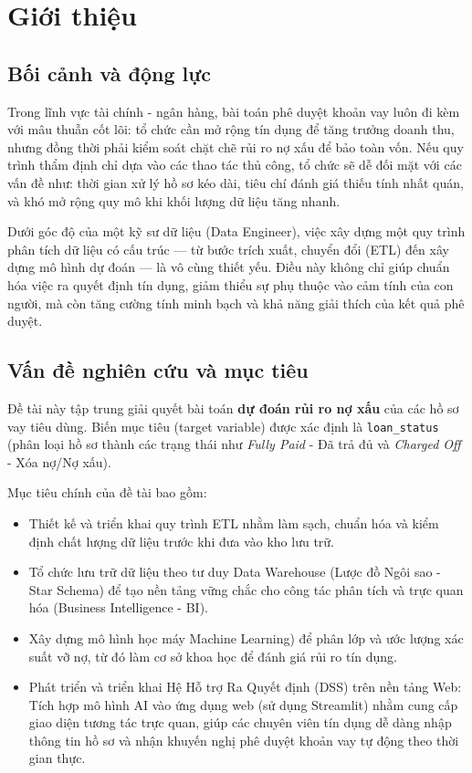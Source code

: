 \section{Giới thiệu}

\subsection{Bối cảnh và động lực}
Trong lĩnh vực tài chính - ngân hàng, bài toán phê duyệt khoản vay luôn đi kèm với mâu thuẫn cốt lõi: tổ chức cần mở rộng tín dụng để tăng trưởng doanh thu, nhưng đồng thời phải kiểm soát chặt chẽ rủi ro nợ xấu để bảo toàn vốn. Nếu quy trình thẩm định chỉ dựa vào các thao tác thủ công, tổ chức sẽ dễ đối mặt với các vấn đề như: thời gian xử lý hồ sơ kéo dài, tiêu chí đánh giá thiếu tính nhất quán, và khó mở rộng quy mô khi khối lượng dữ liệu tăng nhanh.

Dưới góc độ của một kỹ sư dữ liệu (Data Engineer), việc xây dựng một quy trình phân tích dữ liệu có cấu trúc — từ bước trích xuất, chuyển đổi (ETL) đến xây dựng mô hình dự đoán — là vô cùng thiết yếu. Điều này không chỉ giúp chuẩn hóa việc ra quyết định tín dụng, giảm thiểu sự phụ thuộc vào cảm tính của con người, mà còn tăng cường tính minh bạch và khả năng giải thích của kết quả phê duyệt.

\subsection{Vấn đề nghiên cứu và mục tiêu}
Đề tài này tập trung giải quyết bài toán \textbf{dự đoán rủi ro nợ xấu} của các hồ sơ vay tiêu dùng. Biến mục tiêu (target variable) được xác định là \texttt{loan\_status} (phân loại hồ sơ thành các trạng thái như \textit{Fully Paid} - Đã trả đủ và \textit{Charged Off} - Xóa nợ/Nợ xấu).

Mục tiêu chính của đề tài bao gồm:
\begin{itemize}
    \item Thiết kế và triển khai quy trình ETL nhằm làm sạch, chuẩn hóa và kiểm định chất lượng dữ liệu trước khi đưa vào kho lưu trữ.
    \item Tổ chức lưu trữ dữ liệu theo tư duy Data Warehouse (Lược đồ Ngôi sao - Star Schema) để tạo nền tảng vững chắc cho công tác phân tích và trực quan hóa (Business Intelligence - BI).
    \item Xây dựng mô hình học máy Machine Learning) để phân lớp và ước lượng xác suất vỡ nợ, từ đó làm cơ sở khoa học để đánh giá rủi ro tín dụng.
    \item Phát triển và triển khai Hệ Hỗ trợ Ra Quyết định (DSS) trên nền tảng Web: Tích hợp mô hình AI vào ứng dụng web (sử dụng Streamlit) nhằm cung cấp giao diện tương tác trực quan, giúp các chuyên viên tín dụng dễ dàng nhập thông tin hồ sơ và nhận khuyến nghị phê duyệt khoản vay tự động theo thời gian thực.
\end{itemize}

